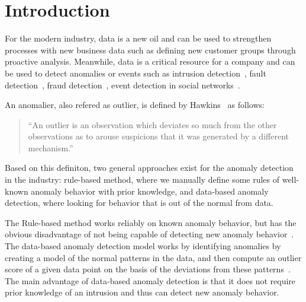 \section{Introduction}\label{sec-intro}

For the modern industry, 
data is a new oil and 
can be used to strengthen processes with new business data 
such as defining new customer groups through proactive analysis. 
Meanwhile, 
data is a critical resource for a company and 
can be used to detect anomalies or events such as 
intrusion detection~\cite{garcia2009anomaly}, 
fault detection~\cite{hwang2009survey}, 
fraud detection~\cite{bolton2002statistical},
event detection in social networks~\cite{sakaki2010earthquake}.

An anomalier,
also refered as outlier,
is defined by Hawkins~\cite{hawkins1980identification}
as follows:
\begin{quotation}
``An outlier is an observation which
deviates so much from the other observations
as to arouse suspicions that
it was generated by a different mechanism.''
\end{quotation}
Based on this definiton,
two general approaches exist for the anomaly
detection in the industry:
rule-based method,
where we manually define some rules of
well-known anomaly behavior
with prior knowledge,
and data-based anomaly detection,
where looking for behavior that
is out of the normal from data.

The Rule-based method works reliably on known anomaly behavior,
but has the obvious disadvantage of not being capable of
detecting new anomaly behavior~\cite{chandola2009anomaly}.
The data-based anomaly detection model works by
identifying anomalies by creating a model of
the normal patterns in the data,
and then compute an outlier score of a given data point
on the basis of the deviations from these patterns~\cite{chandola2009anomaly}.
The main advantage of data-based anomaly detection is that
it does not require prior knowledge of an intrusion and
thus can detect new anomaly behavior.

